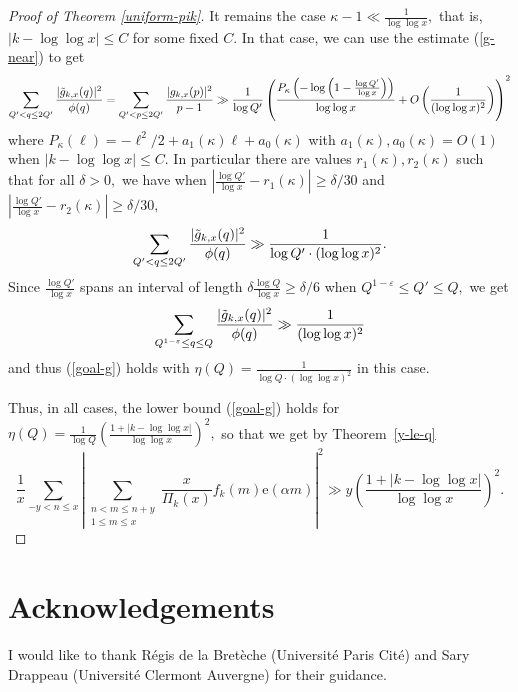 \documentclass{article}
\newcommand{\e}{\mathrm{e}}
\newcommand{\eps}{\varepsilon}
\begin{document}
\begin{proof}[Proof of Theorem \ref{uniform-pik}]
    It remains the case $\kappa-1 \ll \frac{1}{\log\log x},$ that is, $|k - \log\log x| \le C$ for some fixed $C.$ In that case, we can use the estimate (\ref{g-near}) to get 
    \begin{equation}\label{step-P}
        \sum_{Q' < q \le 2Q'} \frac{|\Tilde{g}_{k,x}(q)|^2}{\phi(q)} = \sum_{Q' < p\le 2Q'} \frac{|g_{k,x}(p)|^2}{p-1} \gg \frac{1}{\log Q'} \left(\frac{P_\kappa\left(-\log\left(1 - \frac{\log Q'}{\log x}\right)\right)}{\log\log x} + O\left(\frac{1}{(\log\log x)^2}\right)\right)^2
    \end{equation}
    where $P_\kappa(\ell) = -\ell^2/2 + a_1(\kappa)\ell + a_0(\kappa)$ with $a_1(\kappa), a_0(\kappa) = O(1)$ when $|k - \log\log x| \le C.$ In particular there are values $r_1(\kappa), r_2(\kappa)$ such that for all $\delta > 0,$ we have when $\left|\frac{\log Q'}{\log x} - r_1(\kappa)\right| \ge \delta/30$ and $\left|\frac{\log Q'}{\log x} - r_2(\kappa)\right| \ge \delta/30,$ $$\sum_{Q' < q \le 2Q'} \frac{|\Tilde{g}_{k,x}(q)|^2}{\phi(q)} \gg \frac{1}{\log Q'\cdot (\log\log x)^2}.$$ Since $\frac{\log Q'}{\log x}$ spans an interval of length $\delta\frac{\log Q}{\log x} \ge \delta/6$ when $Q^{1-\eps} \le Q'\le Q,$ we get $$\sum_{Q^{1-\eps} \le q \le Q} \frac{|\Tilde{g}_{k,x}(q)|^2}{\phi(q)} \gg \frac{1}{(\log\log x)^2}$$ and thus (\ref{goal-g}) holds with $\eta(Q) = \frac{1}{\log Q\cdot(\log\log x)^2}$ in this case.

    Thus, in all cases, the lower bound (\ref{goal-g}) holds for $\eta(Q) = \frac{1}{\log Q}\left(\frac{1 + |k-\log\log x|}{\log\log x}\right)^2,$ so that we get by Theorem~\ref{y-le-q} $$\frac{1}{x} \sum_{-y < n\le x} \left|\sum_{\substack{n< m\le n+y \\ 1 \le m \le x}} \frac{x}{\Pi_k(x)} f_k(m) \e(\alpha m)\right|^2 \gg y\left(\frac{1 + |k-\log\log x|}{\log\log x}\right)^2.$$
\end{proof}

\section*{Acknowledgements}

I would like to thank R\'egis de la Bret\`eche (Universit\'e Paris Cit\'e) and Sary Drappeau (Universit\'e Clermont Auvergne) for their guidance. 

\printbibliography
\end{document}
